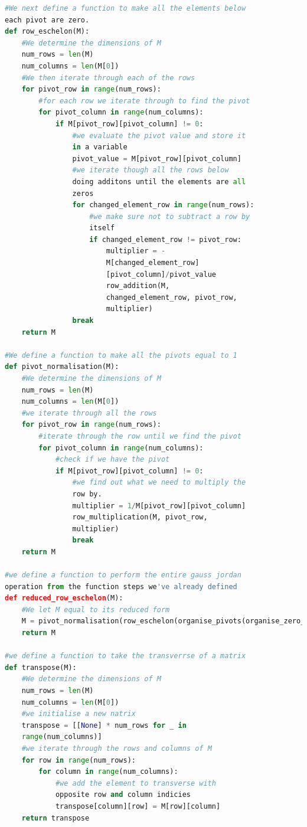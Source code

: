 \documentclass{article}
\begin{document}
\begin{lstlisting}[language=Python, caption=Functions In Linear Algebra, label=fuctions]
#We next define a function to make all the elements below 
each pivot are zero.
def row_eschelon(M):
    #We determine the dimensions of M
    num_rows = len(M)
    num_columns = len(M[0])
    #We then iterate through each of the rows
    for pivot_row in range(num_rows):
        #for each row we iterate through to find the pivot
        for pivot_column in range(num_columns):
            if M[pivot_row][pivot_column] != 0:
                #we evaluate the pivot value and store it 
                in a variable
                pivot_value = M[pivot_row][pivot_column]
                #we iterate though all the rows below 
                doing additons until the elements are all 
                zeros
                for changed_element_row in range(num_rows):
                    #we make sure not to subtract a row by 
                    itself
                    if changed_element_row != pivot_row:
                        multiplier = -
                        M[changed_element_row]
                        [pivot_column]/pivot_value
                        row_addition(M, 
                        changed_element_row, pivot_row, 
                        multiplier)
                break
    return M

#We define a function to make all the pivots equal to 1
def pivot_normalisation(M):
    #We determine the dimensions of M
    num_rows = len(M)
    num_columns = len(M[0])
    #we iterate through all the rows
    for pivot_row in range(num_rows):
        #iterate through the row until we find the pivot
        for pivot_column in range(num_columns):
            #check if we have the pivot
            if M[pivot_row][pivot_column] != 0:
                #we find out what we need to multiply the 
                row by.
                multiplier = 1/M[pivot_row][pivot_column]
                row_multiplication(M, pivot_row, 
                multiplier)
                break
    return M

#we define a function to perform the entire gauss jordan 
operation from the function steps we've already defined
def reduced_row_eschelon(M):
    #We let M equal to its reduced form
    M = pivot_normalisation(row_eschelon(organise_pivots(organise_zero_rows(M))))
    return M
    
#we define a function to take the transverrse of a matrix
def transpose(M):
    #We determine the dimensions of M
    num_rows = len(M)
    num_columns = len(M[0])
    #we initialise a new natrix
    transpose = [[None] * num_rows for _ in 
    range(num_columns)]
    #we iterate through the rows and columns of M
    for row in range(num_rows):
        for column in range(num_columns):
            #we add the element to transverse with 
            opposite row and column indicies
            transpose[column][row] = M[row][column]
    return transpose


\end{lstlisting}
\end{document}
